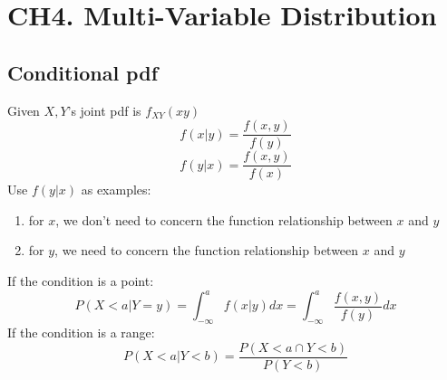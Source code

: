 \documentclass[12pt]{article}
\begin{document}
\section*{CH4. Multi-Variable Distribution}
\subsection*{Conditional pdf}
Given $X, Y$'s joint pdf is $f_{XY}(xy)$
\begin{equation}
    f(x|y)=\frac{f(x,y)}{f(y)}
\end{equation}
\begin{equation}
    f(y|x)=\frac{f(x,y)}{f(x)}
\end{equation}
Use $f(y|x)$ as examples:
\begin{enumerate}
    \item for $x$, we don't need to concern the function relationship between $x$ and $y$
    \item for $y$, we need to concern the function relationship between $x$ and $y$
\end{enumerate}
If the condition is a point:
\begin{equation}
    P(X<a|Y=y)=\int_{-\infty}^a f(x|y)dx=\int_{-\infty}^a \frac{f(x,y)}{f(y)}dx
\end{equation}
If the condition is a range:
\begin{equation}
    P(X<a|Y<b)=\frac{P(X<a \cap Y<b)}{P(Y<b)}
\end{equation}
\end{document}
